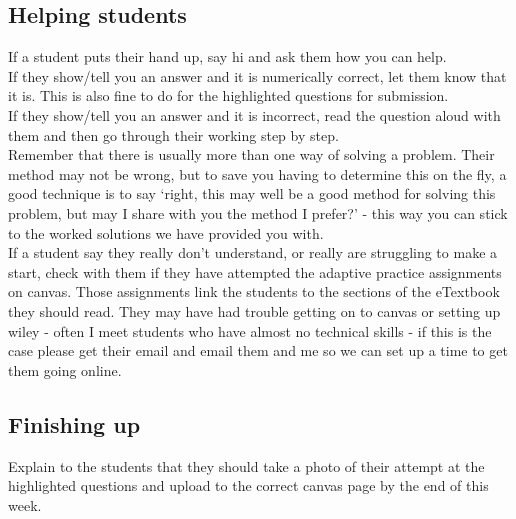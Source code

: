 \documentclass[11.5pt,sans,english]{article}
\begin{document}
\subsection{Helping students}
If a student puts their hand up, say hi and ask them how you can help.\\
If they show/tell you an answer and it is numerically correct, let them know that it is. This is also fine to do for the highlighted questions for submission.\\
If they show/tell you an answer and it is incorrect, read the question aloud with them and then go through their working step by step.\\
Remember that there is usually more than one way of solving a problem. Their method may not be wrong, but to save you having to determine this on the fly, a good technique is to say `right, this may well be a good method for solving this problem, but may I share with you the method I prefer?' - this way you can stick to the worked solutions we have provided you with.\\
If a student say they really don't understand, or really are struggling to make a start, check with them if they have attempted the adaptive practice assignments on canvas. Those assignments link the students to the sections of the eTextbook they should read. They may have had trouble getting on to canvas or setting up wiley - often I meet students who have almost no technical skills - if this is the case please get their email and email them and me so we can set up a time to get them going online. \\

\subsection{Finishing up}
Explain to the students that they should take a photo of their attempt at the highlighted questions and upload to the correct canvas page by the end of this week.\\
\end{document}
